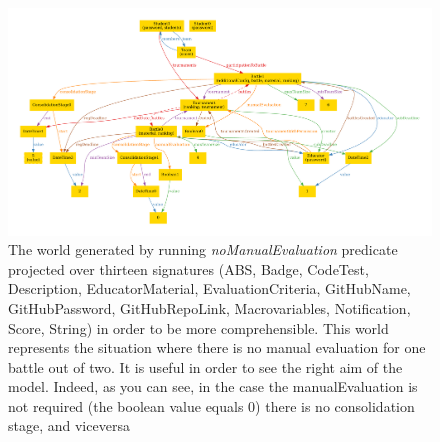\begin{figure}[h]
  \centering
  \includegraphics[width=1.1\linewidth]{RASD/4Alloy/res/noManualEvaluation.pdf}
  \caption{The world generated by running \textit{noManualEvaluation} predicate projected over thirteen signatures (ABS, Badge, CodeTest, Description, EducatorMaterial, EvaluationCriteria, GitHubName, GitHubPassword, GitHubRepoLink, Macrovariables, Notification, Score, String) in order to be more comprehensible. This world represents the situation where there is no manual evaluation for one battle out of two. It is useful in order to see the right aim of the model. Indeed, as you can see, in the case the manualEvaluation is not required (the boolean value equals 0) there is no consolidation stage, and viceversa}
\end{figure}

